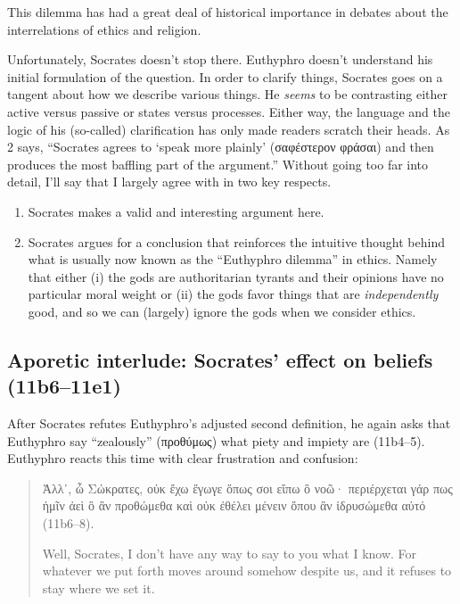 \documentclass[11pt]{article}
\begin{document}
This dilemma has had a great deal of historical importance in debates about the interrelations of ethics and religion.

Unfortunately, Socrates doesn't stop there.  Euthyphro doesn't understand his initial formulation of the question.  In order to clarify things, Socrates goes on a tangent about how we describe various things.  He \emph{seems} to be contrasting either active versus passive or states versus processes.  Either way, the language and the logic of his (so-called) clarification has only made readers scratch their heads.  As \cite{cohen1971} 2 says, ``Socrates agrees to `speak more plainly' ({\g σαφέστερον φράσαι}) and then produces the most baffling part of the argument.''  Without going too far into detail, I'll say that I largely agree with \citet{cohen1971} in two key respects.
\begin{enumerate}
    \item Socrates makes a valid and interesting argument here.
    \item Socrates argues for a conclusion that reinforces the intuitive thought behind what is usually now known as the ``Euthyphro dilemma'' in ethics. Namely that either (i) the gods are authoritarian tyrants and their opinions have no particular moral weight or (ii) the gods favor things that are \textit{independently} good, and so we can (largely) ignore the gods when we consider ethics.
\end{enumerate}


\subsection{Aporetic interlude: Socrates' effect on beliefs (11b6--11e1)}

After Socrates refutes Euthyphro's adjusted second definition, he again asks that Euthyphro say ``zealously'' ({\g προθύμως}) what piety and impiety are (11b4--5).  Euthyphro reacts this time with clear frustration and confusion:

\begin{quote}

    {\g
    Ἀλλ᾽, ὦ Σώκρατες, οὐκ ἔχω ἔγωγε ὅπως σοι εἴπω ὃ νοῶ· περιέρχεται γάρ πως ἡμῖν ἀεὶ ὃ ἂν προθώμεθα καὶ οὐκ ἐθέλει μένειν ὅπου ἂν ἱδρυσώμεθα αὐτό
    } (11b6--8).

    Well, Socrates, I don't have any way to say to you what I know.  For whatever we put forth moves around somehow despite us, and it refuses to stay where we set it.

\end{quote}
\end{document}
